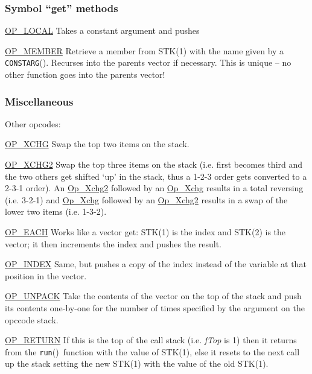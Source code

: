 \documentclass{article}
\newcommand{\name}[1]{{\it #1}}
\newcommand{\func}[1]{\textcolor{func}{\tt #1}}
\newcommand{\localmacro}[1]{\textcolor{func}{\tt #1}}
\newcommand{\OP} [1]{\hyperref[op:#1]{\textcolor{opcode}{OP\_#1}}}
\newcommand{\Op} [1]{\hyperref[op:#1]{\textcolor{opcode}{\sc Op\_#1}}}
\newcommand{\fp}{\textcolor{func}{()}}
\begin{document}
\subsubsection{Symbol ``get'' methods}

\begin{description}
    \item \OP{LOCAL}  \label{op:LOCAL}\label{op:Local} Takes a constant argument and pushes 
    \item \OP{MEMBER} \label{op:MEMBER}\label{op:Member} Retrieve a member from STK(1) with the name given by a \localmacro{CONSTARG}\fp.  Recurses into the parents vector if necessary.  This is unique -- no other function goes into the parents vector!
\end{description}

\subsubsection{Miscellaneous}
Other opcodes:
\begin{description}
    \item \OP{XCHG}   \label{op:XCHG}\label{op:Xchg}  Swap the top two items on the stack.
    \item \OP{XCHG2}  \label{op:XCHG2}\label{op:Xchg2} Swap the top three items on the stack (i.e. first becomes third and the two others get shifted `up' in the stack, thus a 1-2-3 order gets converted to a 2-3-1 order).  An \Op{Xchg2} followed by an \Op{Xchg} results in a total reversing (i.e. 3-2-1) and \Op{Xchg} followed by an \Op{Xchg2} results in a swap of the lower two items (i.e. 1-3-2).
    \item \OP{EACH}   \label{op:EACH}\label{op:Each} Works like a vector get: STK(1) is the index and STK(2) is the vector; it then increments the index and pushes the result.
    \item \OP{INDEX}  \label{op:INDEX}\label{op:Index} Same, but pushes a copy of the index instead of the variable at that position in the vector.
    \item \OP{UNPACK} \label{op:UNPACK}\label{op:Unpack} Take the contents of the vector on the top of the stack and push its contents one-by-one for the number of times specified by the argument on the opccode stack.
    \item \OP{RETURN} \label{op:RETURN}\label{op:Return} If this is the top of the call stack (i.e. \name{fTop} is 1) then it returns from the \func{run}\fp\ function with the value of STK(1), else it resets to the next call up the stack setting the new STK(1) with the value of the old STK(1).
\end{description}
\end{document}
